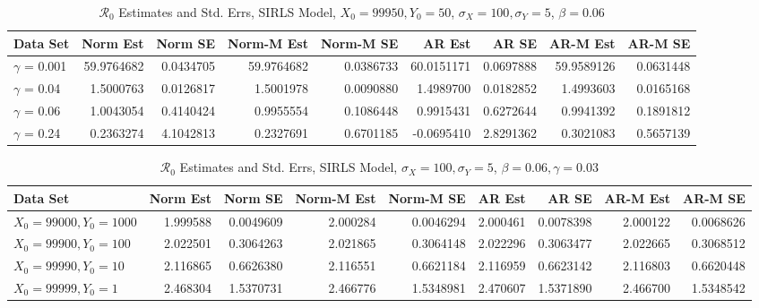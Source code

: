 \documentclass[12pt]{article}
\newcommand{\rr}{\ensuremath{\mathcal{R}_0}}
\begin{document}
\begin{table}[H]
	
	\caption{\label{tab:}$\rr$ Estimates and Std. Errs, SIRLS Model,
		$X_0 = 99950, Y_0 = 50$, $\sigma_X = 100, \sigma_Y = 5$, $\beta = 0.06$}
	\centering
	\begin{footnotesize}
		\begin{tabular}[t]{l|r|r|r|r|r|r|r|r}
			\hline
			Data Set & Norm Est & Norm SE & Norm-M Est & Norm-M SE & AR Est & AR SE & AR-M Est & AR-M SE\\
			\hline
			$\gamma$ = 0.001 & 59.9764682 & 0.0434705 & 59.9764682 & 0.0386733 & 60.0151171 & 0.0697888 & 59.9589126 & 0.0631448\\
			\hline
			$\gamma$ = 0.04 & 1.5000763 & 0.0126817 & 1.5001978 & 0.0090880 & 1.4989700 & 0.0182852 & 1.4993603 & 0.0165168\\
			\hline
			$\gamma$ = 0.06 & 1.0043054 & 0.4140424 & 0.9955554 & 0.1086448 & 0.9915431 & 0.6272644 & 0.9941392 & 0.1891812\\
			\hline
			$\gamma$ = 0.24 & 0.2363274 & 4.1042813 & 0.2327691 & 0.6701185 & -0.0695410 & 2.8291362 & 0.3021083 & 0.5657139\\
			\hline
		\end{tabular}
	\end{footnotesize}
\end{table}

\begin{table}[H]
	
	\caption{\label{tab:}$\rr$ Estimates and Std. Errs, SIRLS Model,
		$\sigma_X = 100, \sigma_Y = 5$, $\beta = 0.06, \gamma = 0.03$}
	\centering
	\begin{footnotesize}
		\begin{tabular}[t]{l|r|r|r|r|r|r|r|r}
			\hline
			Data Set & Norm Est & Norm SE & Norm-M Est & Norm-M SE & AR Est & AR SE & AR-M Est & AR-M SE\\
			\hline
			$X_0 = 99000, Y_0 = 1000$ & 1.999588 & 0.0049609 & 2.000284 & 0.0046294 & 2.000461 & 0.0078398 & 2.000122 & 0.0068626\\
			\hline
			$X_0 = 99900, Y_0 = 100$ & 2.022501 & 0.3064263 & 2.021865 & 0.3064148 & 2.022296 & 0.3063477 & 2.022665 & 0.3068512\\
			\hline
			$X_0 = 99990, Y_0 = 10$ & 2.116865 & 0.6626380 & 2.116551 & 0.6621184 & 2.116959 & 0.6623142 & 2.116803 & 0.6620448\\
			\hline
			$X_0 = 99999, Y_0 = 1$ & 2.468304 & 1.5370731 & 2.466776 & 1.5348981 & 2.470607 & 1.5371890 & 2.466700 & 1.5348542\\
			\hline
		\end{tabular}
	\end{footnotesize}
\end{table}
\end{document}
